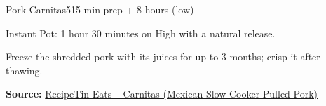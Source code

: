 \begin{recipebox}{Pork Carnitas}{5}{15 min prep + 8 hours (low)}
\begin{notelist}
  \item Instant Pot: 1 hour 30 minutes on High with a natural release.
  \item Freeze the shredded pork with its juices for up to 3 months; crisp it after
        thawing.
\end{notelist}

\noindent\textbf{Source:} \href{https://www.recipetineats.com/pork-carnitas-mexican-slow-cooker-pulled-pork/}{RecipeTin Eats -- Carnitas (Mexican Slow Cooker Pulled Pork)}

\end{recipebox}
